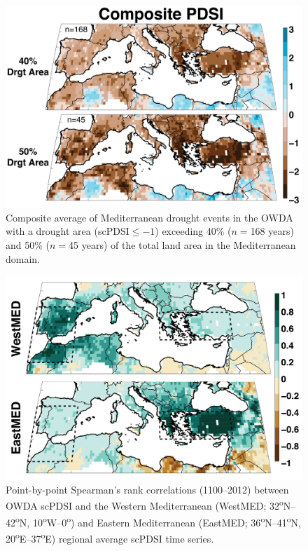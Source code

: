 \documentclass[draft,jgr]{AGUTeX}
\begin{document}
\begin{figure}
\center
\includegraphics[width=0.9\columnwidth]{fig_06_pdsi_40_50_composite.png}
\caption{Composite average of Mediterranean drought events in the OWDA with a drought area (scPDSI$\le-1$) exceeding 40\% ($n=$168 years) and 50\% ($n=$45 years) of the total land area in the Mediterranean domain.}\label{placeholder}
\end{figure}

\begin{figure}
\center
\includegraphics[width=0.9\columnwidth]{fig_07_east_west_corrmap.png}
\caption{Point-by-point Spearman's rank correlations (1100--2012) between OWDA scPDSI and the Western Mediterranean (WestMED; 32\textsuperscript{o}N--42\textsuperscript{o}N, 10\textsuperscript{o}W--0\textsuperscript{o}) and Eastern Mediterranean (EastMED; 36\textsuperscript{o}N--41\textsuperscript{o}N, 20\textsuperscript{o}E--37\textsuperscript{o}E) regional average scPDSI time series.}\label{placeholder}
\end{figure}
\end{document}
